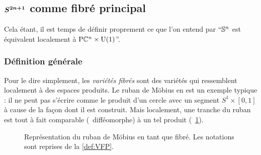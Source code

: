 \subsection{$\bf{S^{2n+1}}$ comme fibré principal} \label{subsec:VFP}

Cela étant, il est temps de définir proprement ce que l'on entend par ``$\S{n}$ est équivalent localement à $\PC{n}\times\U{1}$''.

\subsubsection{Définition générale}\label{subsec:def2VFP}

Pour le dire simplement, les \emph{variétés fibrés} sont des variétés qui ressemblent localement à des espaces produits. 
Le ruban de Möbius en est un exemple typique : il ne peut pas s'écrire comme le produit d'un cercle avec un segment $S^{1}\times [0,1]$ à cause de la façon dont il est construit. Mais localement, une tranche du ruban est tout à fait comparable (\ie~difféomorphe) à un tel produit (\cf~\cref{fig:ruban2modius}).
\begin{figure}[h]
	
	\caption[\DONE Ruban de Möbius comme variété fibrée]{Représentation du ruban de Möbius en tant que fibré. Les notations sont reprises de la \cref{def:VFP}.}
	\label{fig:ruban2modius}
\end{figure}
\skipl

